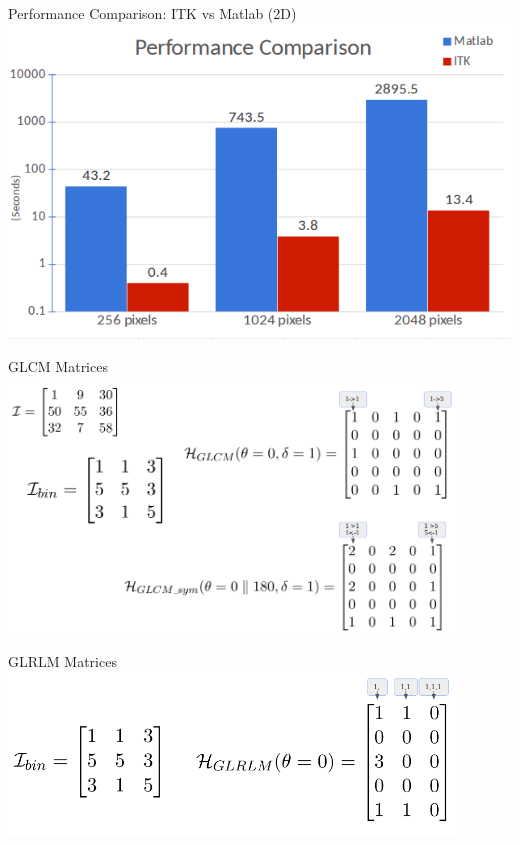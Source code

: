 \documentclass[10pt,aspectratio=169]{beamer}
\begin{document}
{
\begin{frame}[fragile]{Performance Comparison: ITK vs Matlab (2D)}
  \centering
  \includegraphics[height=0.9\textheight]{./figures/TextureFeaturesPerformanceComparison.png}
\end{frame}

\begin{frame}[fragile]{GLCM Matrices}
  \centering
  \includegraphics[width=0.9\textwidth]{./figures/GLCM_matrices.png}
\end{frame}

\begin{frame}[fragile]{GLRLM Matrices}
  \centering
  \includegraphics[width=0.9\textwidth]{./figures/GLRLM_matrices.png}
\end{frame}
}
\end{document}
